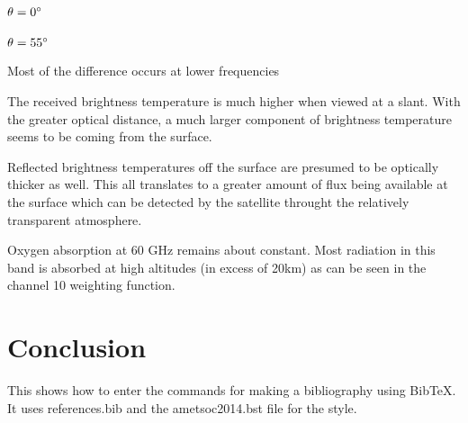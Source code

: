 \documentclass[twocol]{ametsoc}
\begin{document}
\subsubsection{$\theta = 0 \degree{} $}
\subsubsection{$\theta = 55 \degree{} $}

Most of the difference occurs at lower frequencies

The received brightness temperature is much higher when viewed at a slant. With the greater optical distance, a much larger component of brightness temperature seems to be coming from the surface. 

Reflected brightness temperatures off the surface are presumed to be optically thicker as well. This all translates to a greater amount of flux being available at the surface which can be detected by the satellite throught the relatively transparent atmosphere.

Oxygen absorption at 60 GHz remains about constant. Most radiation in this band is absorbed at high altitudes (in excess of 20km) as can be seen in the channel 10 weighting function.


\section{Conclusion}

 This shows how to enter the commands for making a bibliography using
 BibTeX. It uses references.bib and the ametsoc2014.bst file for the style.

 
 
\end{document}
